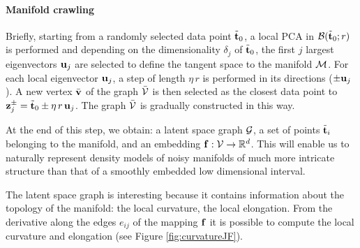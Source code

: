 \paragraph{Manifold crawling}
Briefly, starting from a randomly selected data point $\tilde{\boldsymbol{\mathbf{t}}}_0$, a local PCA in $\mathcal{B}(\tilde{\boldsymbol{\mathbf{t}}}_0;r)$ is performed and depending on the dimensionality $\delta_j$ of $\tilde{\boldsymbol{\mathbf{t}}}_0$, the first $j$ largest eigenvectors $\boldsymbol{\mathbf{u}}_j$ are selected to define the tangent space to the manifold $\mathcal{M}$.
For each local eigenvector $\boldsymbol{\mathbf{u}}_j$, a step of length $\eta\, r$ is performed in its directions ($\pm \boldsymbol{\mathbf{u}}_j$). A new vertex $\bar{\boldsymbol{\mathbf{v}}}$ of the graph $\bar{\mathcal{V}}$ is then selected as the closest data point to $\boldsymbol{\mathbf{z}}_j^{\pm} = \tilde{\boldsymbol{\mathbf{t}}}_0 \pm \eta\, r\, \boldsymbol{\mathbf{u}}_j$.
The graph $\bar{\mathcal{V}}$ is gradually constructed in this way.

At the end of this step, we obtain: a latent space graph $\mathcal{G}$, a set of points $\tilde{\boldsymbol{\mathbf{t}}}_i$ belonging to the manifold, and an embedding $\boldsymbol{\mathbf{f}}: \mathcal{V} \rightarrow \mathbb{R}^d$.
This will enable us to naturally represent density models of noisy manifolds of much more intricate structure than that of a smoothly embedded low dimensional interval.

The latent space graph is interesting because it contains information about the topology of the manifold: the local curvature, the local elongation.
From the derivative along the edges $e_{ij}$ of the mapping $\boldsymbol{\mathbf{f}}$ it is possible to compute the local curvature and elongation (see Figure \ref{fig:curvatureJF}).




